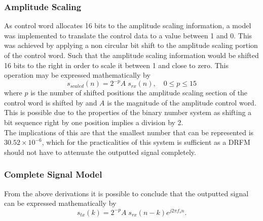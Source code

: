	\subsubsection{Amplitude Scaling}
		As control word allocates 16 bits to the amplitude scaling information, a model was implemented to translate the control data to a value between 1 and 0. This was achieved by applying a non circular bit shift to the amplitude scaling portion of the control word. Such that the amplitude scaling information would be shifted 16 bits to the right in order to scale it between 1 and close to zero. This operation may be expressed mathematically by
		\begin{equation}
			s_{scaled} (n) = 2^{-p} A \; s_{rx}(n),\quad 0 \leq p \leq 15
		\end{equation}
		where $p$ is the number of shifted positions the amplitude scaling section of the control word is shifted by and $A$ is the magnitude of the amplitude control word. This is possible due to the properties of the binary number system as shifting a bit sequence right by one position implies a division by 2. \\ \newline The implications of this are that the smallest number that can be represented is $30.52\times10^{-6}$, which for the practicalities of this system is sufficient as a DRFM should not have to attenuate the outputted signal completely.\\
		
	\subsubsection{Complete Signal Model}
	From the above derivations it is possible to conclude that the outputted signal  can be expressed mathematically by
	\begin{equation}
		s_{tx} (k) = 2^{-p} A\; s_{rx}(n -k) e^{j2\pi f_{s}n}.
	\end{equation}
		
	
	



